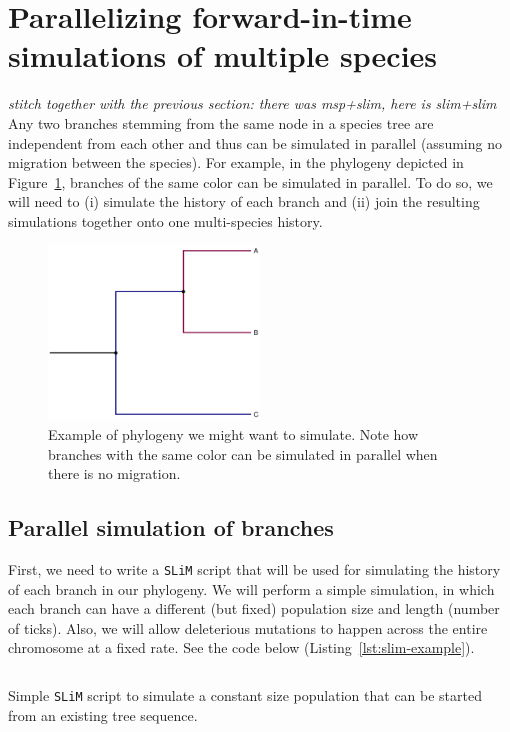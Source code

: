 \documentclass[12pt]{article}
\newcommand{\slim}[0]{\texttt{SLiM}\xspace}
\newcommand{\comment}[1]{\textit{\color{green} #1}}
\begin{document}
\section*{Parallelizing forward-in-time simulations of multiple species}
\comment{stitch together with the previous section: there was msp+slim, here is slim+slim}
Any two branches stemming from the same node in a species tree are independent from each other and
thus can be simulated in parallel (assuming no migration between the species).
For example, in the phylogeny depicted in Figure~\ref{fig:phylo},
branches of the same color can be simulated in parallel.
To do so, we will need to
(i) simulate the history of each branch and
(ii) join the resulting simulations together onto one multi-species history.

 \begin{figure}[h!]
 \centering
  \includegraphics[width=0.5\textwidth]{./code/parallelizing_phylogeny/phylo.pdf}
  \caption{Example of phylogeny we might want to simulate. Note how branches with the same color can be simulated in parallel when there is no migration.}
  \label{fig:phylo}
 \end{figure}

\subsection{Parallel simulation of branches}

First, we need to write a \slim script that will be used for simulating the history of each branch in our phylogeny.
We will perform a simple simulation,
in which each branch can have a different (but fixed) population size and length (number of ticks).
Also, we will allow deleterious mutations to happen across the entire chromosome at a fixed rate.
See the code below (Listing~\ref{lst:slim-example}).

\begin{listing}[H]
  \inputminted[fontsize=\small, linenos, bgcolor=gray!10]{javascript}{./code/parallelizing_phylogeny/simulate_branch.slim}
  \caption{Simple \slim script to simulate a constant size population that can be started from an existing tree sequence.}
  \label{lst:slim-example}
\end{listing}
\end{document}
